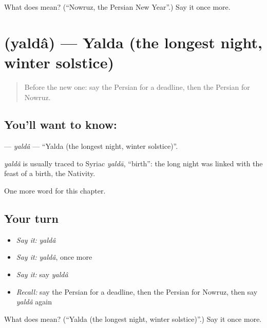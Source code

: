 \begin{tcolorbox}[breakable,colback=teal!4,colframe=teal!35!black,title={Before you move on}]
What does  mean? (\textquotedblleft{}Nowruz, the Persian New Year\textquotedblright{}.) Say it once more.
\end{tcolorbox}
\section[\texorpdfstring{\fa{یلدا} (yaldâ)}{یلدا (yaldâ)}]{ (yaldâ) — Yalda (the longest night, winter solstice)}

\label{lesson:FA-C191-yalda}



\begin{quote}
Before the new one: say the Persian for a deadline, then the Persian for Nowruz.
\end{quote}

\subsection*{You'll want to know: }
\textbf{} — \emph{yaldâ} — \textquotedblleft{}Yalda (the longest night, winter solstice)\textquotedblright{}.

\begin{cousinweb}
\emph{yaldâ} is usually traced to Syriac \emph{yaldā}, \textquotedblleft{}birth\textquotedblright{}: the long night was linked with the feast of a birth, the Nativity.
\end{cousinweb}

\begin{grammarlens}[title={What you've built}]
One more word for this chapter.
\end{grammarlens}

\subsection*{Your turn}
\begin{itemize}
\raggedright
  \item \emph{Say it:} \emph{yaldâ}
  \item \emph{Say it:} \emph{yaldâ}, once more
  \item \emph{Say it:} say \emph{yaldâ}
  \item \emph{Recall:} say the Persian for a deadline, then the Persian for Nowruz, then say \emph{yaldâ} again
\end{itemize}

\begin{tcolorbox}[breakable,colback=teal!4,colframe=teal!35!black,title={Before you move on}]
What does  mean? (\textquotedblleft{}Yalda (the longest night, winter solstice)\textquotedblright{}.) Say it once more.
\end{tcolorbox}
